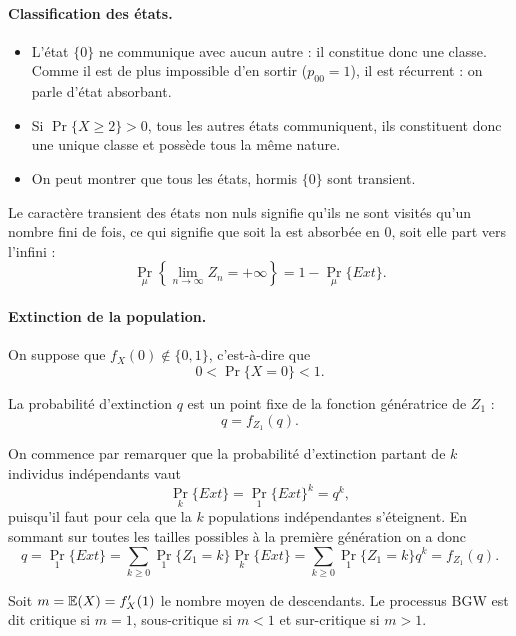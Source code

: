 \paragraph*{Classification des états.} 
\begin{itemize}
 \item L'état $\{0\}$ ne communique avec aucun autre : il constitue donc une classe. Comme il est de plus impossible d'en sortir ($p_{00} = 1$), il est récurrent : on parle d'état absorbant.
 \item Si $\Pr\{X \geq 2\} > 0$, tous les autres états communiquent, ils constituent donc une unique classe et possède tous la même nature.
 \item On peut montrer que tous les états, hormis $\{0\}$ sont transient.
\end{itemize}

Le caractère transient des états non nuls signifie qu'ils ne sont visités qu'un nombre fini de fois, ce qui signifie que soit la \cM est absorbée en 0, soit elle part vers l'infini : 
$$
\Pr_\mu\left\{ \lim_{n \to \infty} Z_n = + \infty\right\} = 1 - \Pr_\mu\{Ext\}.
$$

\paragraph*{Extinction de la population.} 
On suppose que $f_X(0) \notin \{0, 1\}$, c'est-à-dire que 
$$
0 < \Pr\{X = 0\} < 1.
$$

\begin{proposition}
  La probabilité d'extinction $q$ est un point fixe de la fonction génératrice de $Z_1$ :
  $$
  q = f_{Z_1}(q).
  $$
\end{proposition}

\proof
On commence par remarquer que la probabilité d'extinction partant de $k$ individus indépendants vaut
$$
\Pr_k\{Ext\} = \Pr_1\{Ext\}^k = q^k,
$$
puisqu'il faut pour cela que la $k$ populations indépendantes s'éteignent. En sommant sur toutes les tailles possibles à la première génération on a donc
$$
q 
= \Pr_1\{Ext\} 
= \sum_{k \geq 0} \Pr_1\{Z_1 = k\} \Pr_k\{Ext\}
= \sum_{k \geq 0} \Pr_1\{Z_1 = k\} q^k
= f_{Z_1}(q).
$$

\begin{definition}
  Soit $m = \operatorname{\mathbb{E}}(X) = f'_X(1)$ le nombre moyen de descendants. Le processus BGW est dit critique si $m=1$, sous-critique si $m < 1$ et sur-critique si $m > 1$.
\end{definition}

